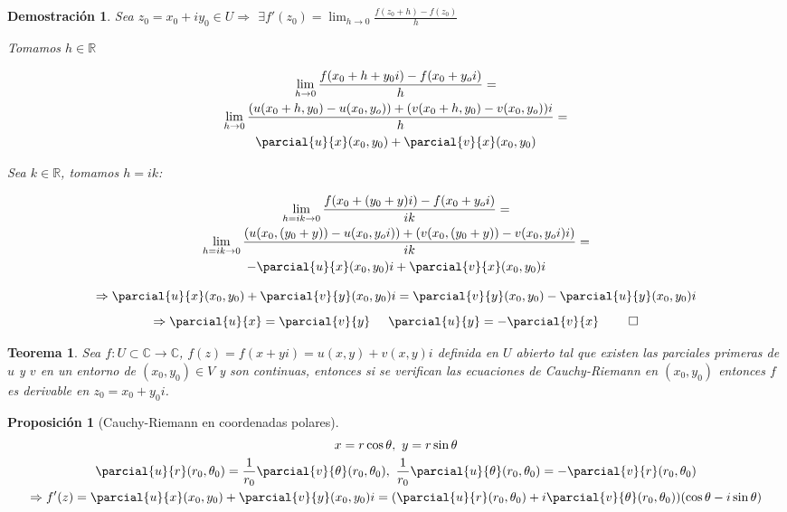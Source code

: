 \documentclass[10pt]{book}
\newtheorem{theorem}{Teorema}[chapter]
\newtheorem{prop}{Proposición}[chapter]
\newtheorem*{dem}{Demostración}
\newcommand{\deriv}{\displaystyle \lim_{h\to 0} \frac{f(z_0+h)-f(z_0)}{h}}
\newcommand{\R}{\mathbb{R}}
\newcommand{\C}{\mathbb{C}}
\newcommand{\f}{f: U\subset \C \longrightarrow \C}
\begin{document}
\begin{dem}
Sea $z_0 = x_0 + iy_0 \in U \Rightarrow$ $\exists f'(z_0) = \deriv$

Tomamos $h \in \R$

\begin{multline*}
\lim_{h\to 0} \frac{f(x_0+h+y_0i)-f(x_0+y_oi)}{h} =\\
 \lim_{h\to 0}\frac{(u(x_0+h,y_0)-u(x_0,y_o)) + (v(x_0+h,y_0)-v(x_0,y_o))i}{h} =\\
  \parcial{u}{x}(x_0,y_0) + \parcial{v}{x}(x_0,y_0)
  \end{multline*}


Sea $k \in\R$, tomamos $h=ik$:

\begin{multline*}
\lim_{h=ik\to 0} \frac{f(x_0+(y_0+y)i)-f(x_0+y_oi)}{ik} =\\
 \lim_{h=ik\to 0} \frac{(u(x_0,(y_0+y))-u(x_0,y_oi))+(v(x_0,(y_0+y))-v(x_0,y_oi)i)}{ik} =\\
  -\parcial{u}{x}(x_0,y_0)i + \parcial{v}{x}(x_0,y_0)i
  \end{multline*}

$$
\Rightarrow \parcial{u}{x}(x_0,y_0) + \parcial{v}{y}(x_0,y_0)i = \parcial{v}{y}(x_0,y_0) - \parcial{u}{y}(x_0,y_0)i
$$$$
\Rightarrow \parcial{u}{x} = \parcial{v}{y} \hspace{0.5cm} \parcial{u}{y} = -\parcial{v}{x}\ \qed
$$
\end{dem}


\begin{theorem}
Sea $\f$, $f(z) = f(x+yi) = u(x,y)+ v(x,y)i$ definida en $U$ abierto tal que existen las parciales primeras de $u$ y $v$ en un entorno de $(x_0,y_0) \in V$ y son continuas, entonces si se verifican las ecuaciones de Cauchy-Riemann en $(x_0,y_0)$ entonces $f$ es derivable en $z_0 = x_0 + y_0i$.
\end{theorem}

\begin{prop}[Cauchy-Riemann en coordenadas polares]
\begin{multline*}
x = r\cos\theta,\ y = r\sin\theta\\
\parcial{u}{r}(r_0,\theta_0) = \frac{1}{r_0}\parcial{v}{\theta}(r_0,\theta_0),\ \frac{1}{r_0}\parcial{u}{\theta}(r_0,\theta_0) = -\parcial{v}{r}(r_0,\theta_0)\\
\Rightarrow f'(z) = \parcial{u}{x}(x_0,y_0) + \parcial{v}{y}(x_0,y_0)i = (\parcial{u}{r}(r_0,\theta_0) + i\parcial{v}{\theta}(r_0,\theta_0))(\cos\theta -i\sin\theta)
\end{multline*}
\end{prop}
\end{document}

